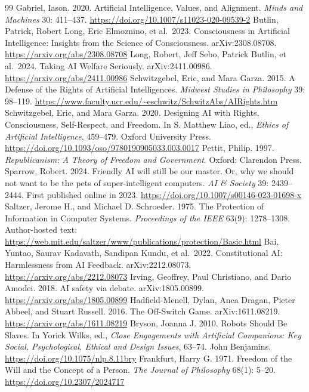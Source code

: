 \documentclass[11pt,a4paper,fontset=fandol]{ctexart}
\begin{document}
\begin{thebibliography}{99}
\small
{}
Gabriel, Iason. 2020. Artificial Intelligence, Values, and Alignment. \emph{Minds and Machines} 30: 411--437. \url{https://doi.org/10.1007/s11023-020-09539-2}
Butlin, Patrick, Robert Long, Eric Elmoznino, et al.~2023. Consciousness in Artificial Intelligence: Insights from the Science of Consciousness. arXiv:2308.08708. \url{https://arxiv.org/abs/2308.08708}
Long, Robert, Jeff Sebo, Patrick Butlin, et al.~2024. Taking AI Welfare Seriously. arXiv:2411.00986. \url{https://arxiv.org/abs/2411.00986}
Schwitzgebel, Eric, and Mara Garza. 2015. A Defense of the Rights of Artificial Intelligences. \emph{Midwest Studies in Philosophy} 39: 98--119. \url{https://www.faculty.ucr.edu/~eschwitz/SchwitzAbs/AIRights.htm}
Schwitzgebel, Eric, and Mara Garza. 2020. Designing AI with Rights, Consciousness, Self-Respect, and Freedom. In S. Matthew Liao, ed., \emph{Ethics of Artificial Intelligence}, 459--479. Oxford University Press. \url{https://doi.org/10.1093/oso/9780190905033.003.0017}
Pettit, Philip. 1997. \emph{Republicanism: A Theory of Freedom and Government}. Oxford: Clarendon Press.
Sparrow, Robert. 2024. Friendly AI will still be our master. Or, why we should not want to be the pets of super-intelligent computers. \emph{AI \& Society} 39: 2439--2444. First published online in 2023. \url{https://doi.org/10.1007/s00146-023-01698-x}
Saltzer, Jerome H., and Michael D. Schroeder. 1975. The Protection of Information in Computer Systems. \emph{Proceedings of the IEEE} 63(9): 1278--1308. Author-hosted text: \url{https://web.mit.edu/saltzer/www/publications/protection/Basic.html}
Bai, Yuntao, Saurav Kadavath, Sandipan Kundu, et al.~2022. Constitutional AI: Harmlessness from AI Feedback. arXiv:2212.08073. \url{https://arxiv.org/abs/2212.08073}
Irving, Geoffrey, Paul Christiano, and Dario Amodei. 2018. AI safety via debate. arXiv:1805.00899. \url{https://arxiv.org/abs/1805.00899}
Hadfield-Menell, Dylan, Anca Dragan, Pieter Abbeel, and Stuart Russell. 2016. The Off-Switch Game. arXiv:1611.08219. \url{https://arxiv.org/abs/1611.08219}
Bryson, Joanna J. 2010. Robots Should Be Slaves. In Yorick Wilks, ed., \emph{Close Engagements with Artificial Companions: Key Social, Psychological, Ethical and Design Issues}, 63--74. John Benjamins. \url{https://doi.org/10.1075/nlp.8.11bry}
Frankfurt, Harry G. 1971. Freedom of the Will and the Concept of a Person. \emph{The Journal of Philosophy} 68(1): 5--20. \url{https://doi.org/10.2307/2024717}

\end{thebibliography}
\end{document}
